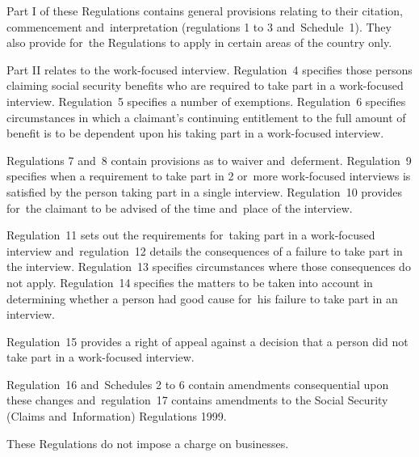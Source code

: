 \documentclass[12pt,a4paper]{article}
\begin{document}
Part I of these Regulations contains general provisions relating to their citation, commencement and~interpretation (regulations 1 to 3 and~Schedule~1). They also provide for~the Regulations to apply in certain areas of the country only.

Part II relates to the work-focused interview. Regulation~4 specifies those persons claiming social security benefits who are required to take part in a work-focused interview. Regulation~5 specifies a number of exemptions. Regulation~6 specifies circumstances in which a claimant’s continuing entitlement to the full amount of benefit is to be dependent upon his taking part in a work-focused interview.

Regulations 7 and~8 contain provisions as to waiver and~deferment. Regulation~9 specifies when a requirement to take part in 2 or~more work-focused interviews is satisfied by the person taking part in a single interview. Regulation~10 provides for~the claimant to be advised of the time and~place of the interview.

Regulation~11 sets out the requirements for~taking part in a work-focused interview and~regulation~12 details the consequences of a failure to take part in the interview. Regulation~13 specifies circumstances where those consequences do not apply. Regulation~14 specifies the matters to be taken into account in determining whether a person had good cause for~his failure to take part in an interview.

Regulation~15 provides a right of appeal against a decision that a person did not take part in a work-focused interview.

Regulation~16 and~Schedules 2 to 6 contain amendments consequential upon these changes and~regulation~17 contains amendments to the Social Security (Claims and~Information) Regulations 1999.

These Regulations do not impose a charge on businesses. 
\end{document}

